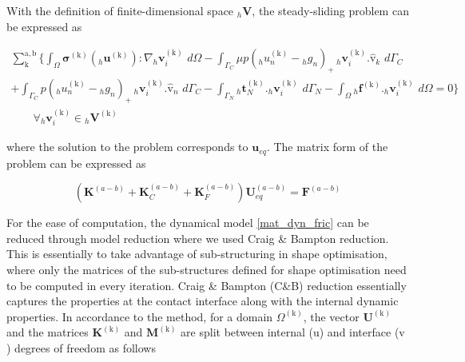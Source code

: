 With the definition of finite-dimensional space ${}_h \bm V$, the steady-sliding problem can be expressed as

 \begin{multline}
 \sum^{\mathrm{a,b}}_{\mathrm{k}}   \bigg\{ \int_{\Omega}  \bm{\sigma}^\mathrm{(k)}({}_h\bm{u}^\mathrm{(k)}):\nabla {}_h \bm v_i^\mathrm{(k)} \,\,d\Omega - \int_{\Gamma_C} \mu\mathit{p}({}_hu_n^\mathrm{(k)}-{}_hg_n)_+\,{}_h \bm v_i^\mathrm{(k)}.\bm{\hat{\mathrm v}}_k \,\, d\Gamma_C\\ + \int_{\Gamma_C} \mathit{p}({}_hu_n^\mathrm{(k)}-{}_hg_n)_+\,{}_h \bm v_i^\mathrm{(k)}.\bm{\hat{\mathrm v}}_n \,\, d\Gamma_C
  -  \int_{\Gamma_N} {}_h\bm{t}_N^\mathrm{(k)}.{}_h \bm v_i^\mathrm{(k)} \,\, d\Gamma_N- \int_{\Omega} {}_h\bm{f}^\mathrm{(k)}.{}_h \bm v_i^\mathrm{(k)} \,\, d\Omega = 0 \bigg\}\\
  \qquad \forall {}_h \bm v_i^{(\mathrm k)} \in {}_h \bm V^{(\mathrm k)}
\end{multline}

where the solution to the problem corresponds to $\bm u_{eq}$. The matrix form of the problem can be expressed as

\begin{equation}\label{mat_stat_fric}
(\mathbf K^{(a-b)} +\mathbf K_C^{(a-b)}+\mathbf K_F^{(a-b)}) \bm U_{eq}^{(a-b)} = \bm F^{(a-b)} 
\end{equation}

 For the ease of computation, the dynamical model \eqref{mat_dyn_fric} can be reduced through model reduction where we used  Craig \& Bampton reduction. This is essentially to take advantage of sub-structuring in shape optimisation, where only the matrices of the sub-structures defined for shape optimisation need to be computed in every iteration. Craig \& Bampton (C\&B) reduction essentially captures the properties at the contact interface along with the internal dynamic properties. In accordance to the method, for a domain $\Omega^{(\mathrm k)}$, the vector $\bm U^{(\mathrm k)}$ and the matrices $\mathbf K^{(\mathrm k)}$ and $\mathbf M^{(\mathrm k)}$ are split between internal ($\mathrm{u}$) and interface ($\mathrm{v}$) degrees of freedom as follows\\ 



